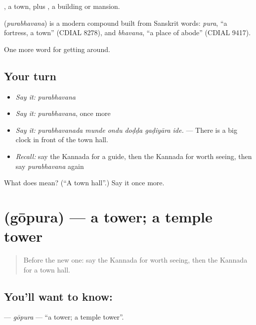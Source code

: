 , a town, plus , a building or mansion.

\begin{cousinweb}
\textbf{} (\emph{purabhavana}) is a modern compound built from Sanskrit words: \emph{pura}, \textquotedblleft{}a fortress, a town\textquotedblright{} (CDIAL 8278), and \emph{bhavana}, \textquotedblleft{}a place of abode\textquotedblright{} (CDIAL 9417).
\end{cousinweb}

\begin{grammarlens}[title={What you've built}]
One more word for getting around.
\end{grammarlens}

\subsection*{Your turn}
\begin{itemize}
\raggedright
  \item \emph{Say it:} \emph{purabhavana}
  \item \emph{Say it:} \emph{purabhavana}, once more
  \item \emph{Say it:} \emph{purabhavanada munde ondu doḍḍa gaḍiyāra ide.} — There is a big clock in front of the town hall.
  \item \emph{Recall:} say the Kannada for a guide, then the Kannada for worth seeing, then say \emph{purabhavana} again
\end{itemize}

\begin{tcolorbox}[breakable,colback=teal!4,colframe=teal!35!black,title={Before you move on}]
What does  mean? (\textquotedblleft{}A town hall\textquotedblright{}.) Say it once more.
\end{tcolorbox}
\section[\texorpdfstring{\kn{ಗೋಪುರ} (gōpura)}{ಗೋಪುರ (gōpura)}]{ (gōpura) — a tower; a temple tower}

\label{lesson:KA-C456-gopura}



\begin{quote}
Before the new one: say the Kannada for worth seeing, then the Kannada for a town hall.
\end{quote}

\subsection*{You'll want to know: }
\textbf{} — \emph{gōpura} — \textquotedblleft{}a tower; a temple tower\textquotedblright{}.

